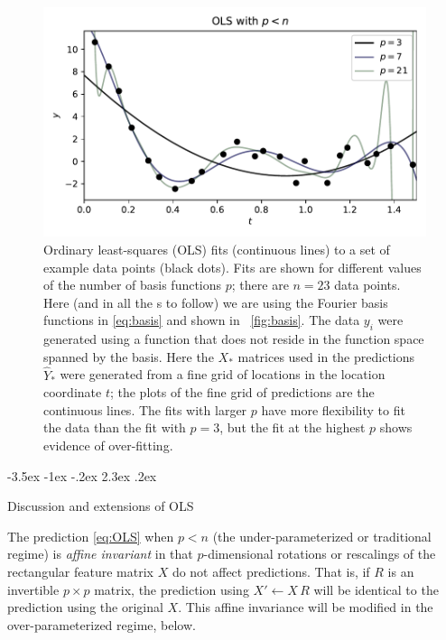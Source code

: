 \documentclass[12pt,letterpaper]{article}
\makeatletter
\newlength{\figurewidth}
\renewcommand\section{\@startsection {section}{1}{\z@}%
  {-3.5ex \@plus -1ex \@minus -.2ex}%
  {2.3ex \@plus.2ex}%
  {\raggedright\normalfont\Large\bfseries}}
\makeatother
\begin{document}
\begin{figure}[t]
    \begin{mdframed}
    \includegraphics[width=\figurewidth]{paper/OLS-under.pdf}
    \caption{Ordinary least-squares (OLS) fits (continuous lines) to a set of example data points (black dots). Fits are shown for different values of the number of basis functions $p$; there are $n=23$ data points. Here (and in all the \figurename s to follow) we are using the Fourier basis functions in \eqref{eq:basis} and shown in \figurename~\ref{fig:basis}. The data $y_i$ were generated using a function that does not reside in the function space spanned by the basis. Here the $X_\ast$ matrices used in the predictions $\hat{Y}_\ast$ were generated from a fine grid of locations in the location coordinate $t$; the plots of the fine grid of predictions are the continuous lines. The fits with larger $p$ have more flexibility to fit the data than the fit with $p=3$, but the fit at the highest $p$ shows evidence of over-fitting.}
    \label{fig:ols1}
    \end{mdframed}
\end{figure}

\section{Discussion and extensions of OLS}\label{sec:extensions}

The prediction \eqref{eq:OLS} when $p<n$ (the under-parameterized or traditional regime) is \emph{affine invariant} in that $p$-dimensional rotations or rescalings of the rectangular feature matrix $X$ do not affect predictions.
That is, if $R$ is an invertible $p\times p$ matrix, the prediction using $X'\leftarrow X\,R$ will be identical to the prediction using the original $X$.
This affine invariance will be modified in the over-parameterized regime, below.
\end{document}
